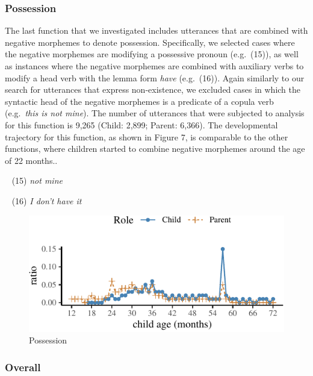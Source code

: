 \documentclass[10pt, letterpaper]{article}
\newenvironment{CodeChunk}{}{}
\begin{document}
\hypertarget{possession}{%
\subsubsection{Possession}\label{possession}}

The last function that we investigated includes utterances that are
combined with negative morphemes to denote possession. Specifically, we
selected cases where the negative morphemes are modifying a possessive
pronoun (e.g.~(15)), as well as instances where the negative morphemes
are combined with auxiliary verbs to modify a head verb with the lemma
form \emph{have} (e.g.~(16)). Again similarly to our search for
utterances that express non-existence, we excluded cases in which the
syntactic head of the negative morphemes is a predicate of a copula verb
(e.g.~\emph{this is not mine}). The number of utterances that were
subjected to analysis for this function is 9,265 (Child: 2,899; Parent:
6,366). The developmental trajectory for this function, as shown in
Figure 7, is comparable to the other functions, where children started
to combine negative morphemes around the age of 22 months..

~ (15) \emph{not mine}

~ (16) \emph{I don't have it}

\begin{CodeChunk}
\begin{figure}[H]

{\centering \includegraphics{figs/possession-1} 

}

\caption[Possession]{Possession}\label{fig:possession}
\end{figure}
\end{CodeChunk}

\hypertarget{overall}{%
\subsubsection{Overall}\label{overall}}
\end{document}
